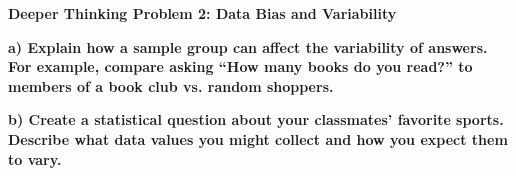 \documentclass[12pt, letterpaper, fleqn]{article}
\begin{document}
\begin{tcolorbox}[colback=yellow!15, colframe=orange, boxrule=1.5pt, arc=4mm, left=6mm, right=6mm, top=5mm, bottom=5mm]
\textbf{Deeper Thinking Problem 2: Data Bias and Variability}

\medskip

\noindent
\textbf{a) Explain how a sample group can affect the variability of answers. For example, compare asking ``How many books do you read?'' to members of a book club vs. random shoppers.}

\vspace{2cm}

\noindent
\textbf{b) Create a statistical question about your classmates' favorite sports. Describe what data values you might collect and how you expect them to vary.}

\vspace{2cm}
\end{tcolorbox}
\newpage
\end{document}
